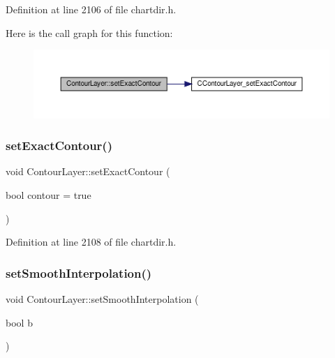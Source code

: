 Definition at line 2106 of file chartdir.\+h.

Here is the call graph for this function\+:
\nopagebreak
\begin{figure}[H]
\begin{center}
\leavevmode
\includegraphics[width=350pt]{class_contour_layer_ad24edcf3dde8cdf7530b67431177679f_cgraph}
\end{center}
\end{figure}
\mbox{\label{class_contour_layer_a3eaad97db2f9436f73922c9922049db3}} 
\subsubsection{\texorpdfstring{set\+Exact\+Contour()}{setExactContour()}\hspace{0.1cm}{\footnotesize\ttfamily [2/2]}}
{\footnotesize\ttfamily void Contour\+Layer\+::set\+Exact\+Contour (\begin{DoxyParamCaption}\item[{bool}]{contour = {\ttfamily true} }\end{DoxyParamCaption})\hspace{0.3cm}{\ttfamily [inline]}}



Definition at line 2108 of file chartdir.\+h.

\mbox{\label{class_contour_layer_a5670bc76e3eed0a1bb14e77caa5c497b}} 
\subsubsection{\texorpdfstring{set\+Smooth\+Interpolation()}{setSmoothInterpolation()}}
{\footnotesize\ttfamily void Contour\+Layer\+::set\+Smooth\+Interpolation (\begin{DoxyParamCaption}\item[{bool}]{b }\end{DoxyParamCaption})\hspace{0.3cm}{\ttfamily [inline]}}



